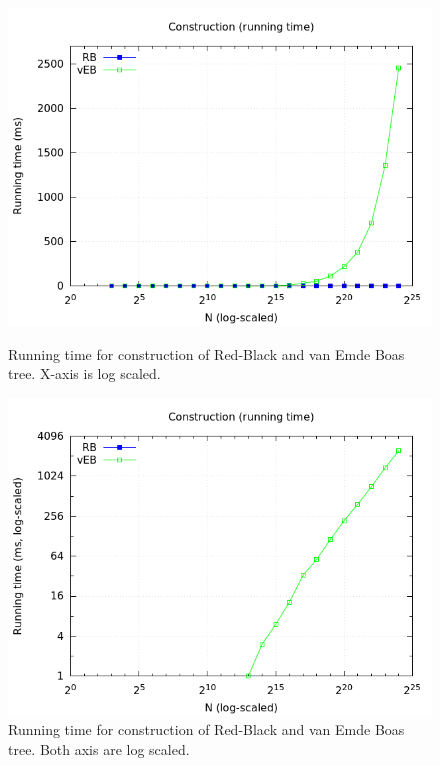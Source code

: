 \documentclass[a4paper,oneside,article,11pt]{memoir}
\begin{document}
\begin{figure}[H]
\centering
\begin{minipage}{0.48\columnwidth}
  \centering
  \includegraphics[width=\linewidth]{../res/rbveb/rbveb_mq_pow2_rt.png}%
  \caption{Running time for construction of Red-Black and van Emde Boas tree. X-axis is log scaled.}
  \label{fig:rbveb_mq_pow2_rt}
\end{minipage}%
\hfill
\begin{minipage}{0.48\columnwidth}
  \centering
  \includegraphics[width=\linewidth]{../res/rbveb/rbveb_mq_pow2_logscale_y_rt.png}%
  \caption{Running time for construction of Red-Black and van Emde Boas tree. Both axis are log scaled.}
  \label{fig:rbveb_mq_pow2_logscale_y_rt}
\end{minipage}
\end{figure}
\end{document}
